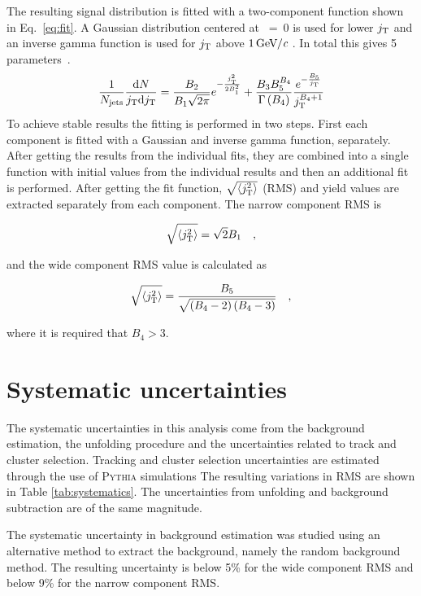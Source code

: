 The resulting signal distribution is fitted with a two-component function shown in Eq.~\ref{eq:fit}. 
A Gaussian distribution centered at \jt~=~0 is used for lower $j_{\rm T}$ and an inverse gamma function is used for $j_{\rm T}$ above $\unit[1]{\GeVc}$ . In total this gives 5 parameters~\cite{ALICEjt}. 
\begin{equation}
\frac{1}{N_{\mathrm{jets}}}\frac{\mathrm{d}N}{j_{\rm T} \mathrm{d}j_{\rm T}} = \frac{B_2}{B_1\sqrt{2\pi}}e^{-\frac{j_{\rm T}^2}{2B_1^2}}+\frac{B_3B_5^{B_4}}{\Gamma\left(B_4\right)}\frac{e^{-\frac{B_5}{j_{\rm T}}}}{j_{\rm T}^{B_4+1}}
\label{eq:fit}
\end{equation}
To achieve stable results the fitting is performed in two steps. First each component is fitted with a Gaussian and inverse gamma function, separately. After getting the results from the individual fits,  they are combined into a single function with initial values from the individual results and then an additional fit is performed. 
After getting the fit function, $\sqrt{\left<j_{\rm T}^2\right>}$ (RMS) and yield values are  extracted separately from each component. The narrow component RMS is

$$\sqrt{\left<j_{\rm T}^2\right>}=\sqrt{2}B_1\quad,$$

and the wide component RMS value is calculated as

$$\sqrt{\left<j_{\rm T}^2\right>}=\frac{B_5}{\sqrt{\left(B_4-2\right)\left(B_4-3\right)}}\quad,$$

where it is required that $B_4 > 3$.

\section{Systematic uncertainties}
\label{sec:systematicerrors}
The systematic uncertainties in this analysis come from the background estimation, the unfolding procedure and the uncertainties related to track and cluster selection. Tracking and cluster selection uncertainties are estimated through the use of \textsc{Pythia} simulations The resulting variations in RMS are shown in Table \ref{tab:systematics}. The uncertainties from unfolding and background subtraction are of the same magnitude.

The systematic uncertainty in background estimation was studied using an alternative method to extract the background, namely the random background method. The resulting uncertainty is below 5\% for the wide component RMS and below 9\% for the narrow component RMS.

